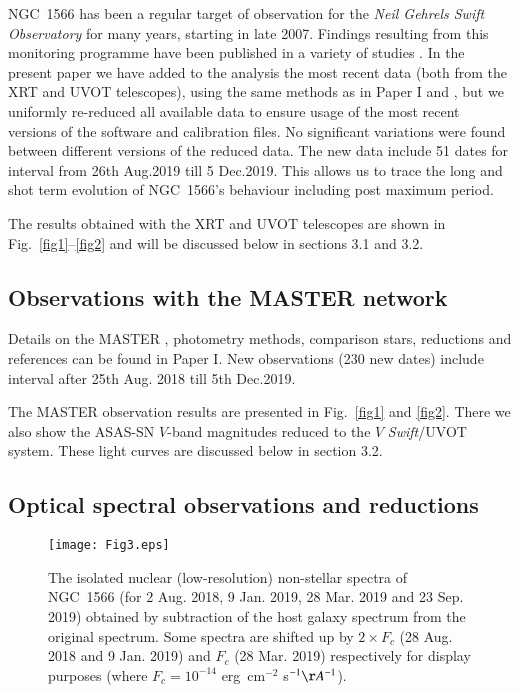 \documentclass[fleqn,usenatbib]{mnras}
\begin{document}
NGC~1566 has been a regular target of observation for the {\it Neil Gehrels Swift Observatory} \citep{Gehrels2004} for many years, starting in late 2007. Findings resulting from this monitoring programme have been published in a variety of studies \citep{Kawamuro2013, Ferrigno2018, Grupe2018, Grupe2018b, Oknyansky2019, Grupe2019, Parker2019}. In the present paper we have added to the analysis the most recent data (both from the XRT and UVOT telescopes), using the same methods as in Paper I and \cite{Oknyansky2017a}, but we uniformly re-reduced all available data to ensure usage of the most recent versions of the software and calibration files.  No significant variations were found between different versions of the reduced data. The new data include 51 dates for interval from 26th Aug.2019 till 5 Dec.2019. This allows us to trace the long and shot term  evolution of NGC~1566's behaviour including  post maximum period. 

The results obtained with the XRT and UVOT telescopes are shown in Fig.~\ref{fig1}--\ref{fig2} and will be discussed below in sections 3.1 and 3.2.


\subsection{Observations with the MASTER network}
Details on the MASTER \citep{Lipunov2010}, photometry methods, comparison stars, reductions and references can be found in Paper I. New observations (230 new dates) 
include interval after 25th Aug. 2018 till 5th Dec.2019.

The MASTER observation results are presented in Fig.~\ref{fig1} and \ref{fig2}. There we also show the ASAS-SN \citep[All-Sky Automated Survey for Supernovae, ][]{Shappee2014, Kochanek2017, Dai2018} $V$-band magnitudes reduced to the $V$ {\it Swift}/UVOT system. These light curves are discussed below in section 3.2.


\subsection{Optical spectral observations and reductions}

\begin{figure*}
\texttt{[image: Fig3.eps]}

    \caption{The isolated nuclear (low-resolution) non-stellar spectra of NGC~1566 (for 2 Aug. 2018, 9 Jan. 2019, 28 Mar. 2019 and 23 Sep. 2019) obtained by subtraction of the host galaxy spectrum  from the original spectrum. Some spectra are shifted up by $2\times F_c$ (28 Aug. 2018 and 9 Jan. 2019) and $F_c$ (28 Mar. 2019) respectively for display purposes (where $F_c = 10^{-14}$ erg~cm$^{-2}$ s$^{-1} \AA^{-1}$).}
    \label{fig3}
\end{figure*}
\end{document}
